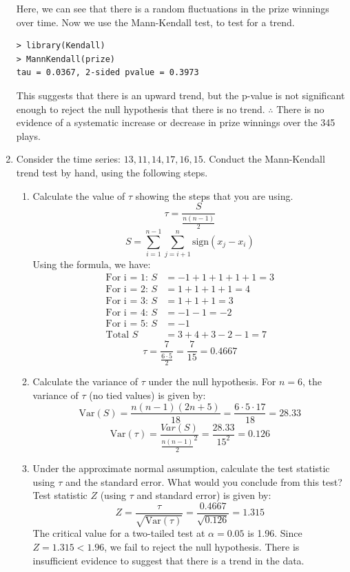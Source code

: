 \documentclass[12pt]{article}
\begin{document}
\begin{enumerate}
\begin{center}
    \end{center}
    Here, we can see that there is a random fluctuations in the prize winnings over time. 
    Now we use the Mann-Kendall test, to test for a trend.
    \begin{verbatim}
> library(Kendall)
> MannKendall(prize)
tau = 0.0367, 2-sided pvalue = 0.3973
    \end{verbatim}
    This suggests that there is an upward trend, but the p-value 
    is not significant enough to reject the null hypothesis that there is no trend.
    $\therefore$ There is no evidence of a systematic increase or decrease in prize winnings over the 345 plays.
    \item Consider the time series: $13, 11, 14, 17, 16, 15$.
    Conduct the Mann-Kendall trend test by hand, using the following steps.
    \begin{enumerate}
        \item Calculate the value of $\tau$ showing the steps that you are using.
        \[ \tau = \frac{S}{\frac{n(n - 1)}{2}} \]
        \[S = \sum_{i=1}^{n-1} \sum_{j=i+1}^{n} \text{sign}(x_j - x_i)\]
        Using the formula, we have:
        \begin{align*}
        \text{For i = 1: } S &= -1 + 1 + 1 + 1 + 1 = 3 \\
        \text{For i = 2: } S &= 1 + 1 + 1 + 1 = 4 \\
        \text{For i = 3: } S &= 1 + 1 + 1 = 3 \\
        \text{For i = 4: } S &= -1 - 1 = -2 \\
        \text{For i = 5: } S &= -1 \\
        \text{Total } S &= 3 + 4 + 3 - 2 - 1 = 7
        \end{align*}
        \[ \tau = \frac{7}{\frac{6 \cdot 5}{2}} = \frac{7}{15} = 0.4667 \]
        \item Calculate the variance of $\tau$ under the null hypothesis.
        For $n = 6$, the variance of $\tau$ (no tied values) is given by:
        \[ \text{Var}(S) = \frac{n(n-1)(2n+5)}{18} = \frac{6 \cdot 5 \cdot 17}{18} = 28.33 \]
        \[ \text{Var}(\tau) = \frac{Var(S)}{\frac{n(n-1)}{2}^2} = \frac{28.33}{15^2} = 0.126 \]
        \item Under the approximate normal assumption, calculate the test statistic using \(\tau\) and the standard error. 
        What would you conclude from this test?
        Test statistic $Z$ (using $\tau$ and standard error) is given by:
        \[ Z = \frac{\tau}{\sqrt{\text{Var}(\tau)}} = \frac{0.4667}{\sqrt{0.126}} = 1.315 \]
        The critical value for a two-tailed test at $\alpha = 0.05$ is 1.96. Since $Z = 1.315 < 1.96$, we fail to reject the null hypothesis.
        There is insufficient evidence to suggest that there is a trend in the data.
    \end{enumerate}
\end{enumerate}
\end{document}
